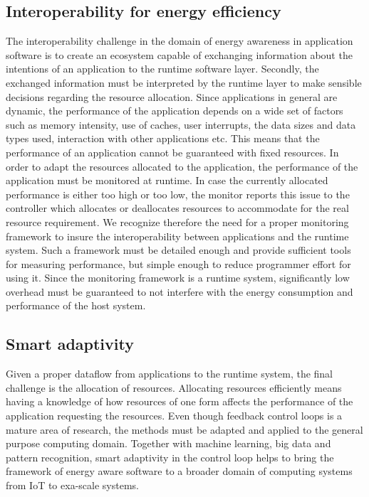 \documentclass{article}
\begin{document}
\subsection{Interoperability for energy efficiency}
\label{sec:inter}
The interoperability challenge in the domain of energy awareness in application software is to create an ecosystem capable of exchanging information about the intentions of an application to the runtime software layer. Secondly, the exchanged information must be interpreted by the runtime layer to make sensible decisions regarding the resource allocation.
Since applications in general are dynamic, the performance of the application depends on a wide set of factors such as memory intensity, use of caches, user interrupts, the data sizes and data types used, interaction with other applications etc. 
This means that the performance of an application cannot be guaranteed with fixed resources.
In order to adapt the resources allocated to the application, the performance of the application must be monitored at runtime.
In case the currently allocated performance is either too high or too low, the monitor reports this issue to the controller which allocates or deallocates resources to accommodate for the real resource requirement.
We recognize therefore the need for a proper monitoring framework to insure the interoperability between applications and the runtime system.
Such a framework must be detailed enough and provide sufficient tools for measuring performance, but simple enough to reduce programmer effort for using it.
Since the monitoring framework is a runtime system, significantly low overhead must be guaranteed to not interfere with the energy consumption and performance of the host system.

\subsection{Smart adaptivity}
\label{sec:smart}
Given a proper dataflow from applications to the runtime system, the final challenge is the allocation of resources. 
Allocating resources efficiently means having a knowledge of how resources of one form affects the performance of the application requesting the resources.
Even though feedback control loops is a mature area of research, the methods must be adapted and applied to the general purpose computing domain. Together with machine learning, big data and pattern recognition, smart adaptivity in the control loop helps to bring the framework of energy aware software to a broader domain of computing systems from IoT to exa-scale systems.
\end{document}
